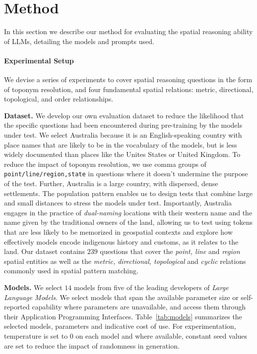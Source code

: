 \section{Method}
\label{section:method}

In this section we describe our method for evaluating the spatial reasoning ability of LLMs, detailing the models and prompts used.


\paragraph{Experimental Setup}
We devise a series of experiments to cover spatial reasoning questions in the form of toponym resolution, and four fundamental spatial relations: metric, directional, topological, and order relationships.



\textbf{Dataset.} 
We develop our own evaluation dataset to reduce the likelihood that the specific questions had been encountered during pre-training by the models under test. 
We select Australia because it is an English-speaking country with place names that are likely to be in the vocabulary of the models, but is less widely documented than places like the Unites States or United Kingdom. 
To reduce the impact of toponym resolution, we use comma groups of \texttt{point/line/region,state} in questions where it doesn't undermine the purpose of the test.
Further, Australia is a large country, with dispersed, dense settlements. 
The population pattern enables us to design tests that combine large and small distances to stress the models under test. 
Importantly, Australia engages in the practice of \textit{dual-naming} locations with their western name and the name given by the traditional owners of the land, allowing us to test using tokens that are less likely to be memorized in geospatial contexts and explore how effectively models encode indigenous history and customs, as it relates to the land.
Our dataset contains $239$ questions that cover the \textit{point, line} and \textit{region} spatial entities as well as the \textit{metric, directional, topological} and \textit{cyclic} relations commonly used in spatial pattern matching.

\textbf{Models.}
We select $14$ models from five of the leading developers of \textit{Large Language Models}. 
We select models that span the available parameter size or self-reported capability where parameters are unavailable, and access them through their Application Programming Interfaces. 
Table~\ref{tab:models} summarizes the selected models, parameters and indicative cost of use. 
For experimentation, temperature is set to $0$ on each model and where available, constant seed values are set to reduce the impact of randomness in generation.

